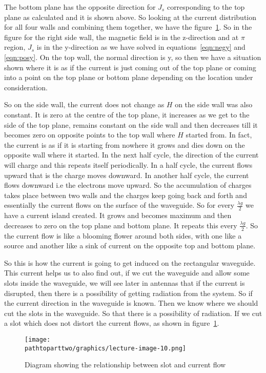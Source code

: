 The bottom plane has the opposite direction for $J_{s}$ corresponding to the top plane as calculated and it is shown above. So looking at the current distribution for all four walls and combining them together, we have the figure~\ref{fig:lectureimage10}. So in the figure for the right side wall, the magnetic field is in the z-direction and at $\pi$ region, $J_{s}$ is in the y-direction as we have solved in equations~\ref{eqn:negy} and \ref{eqn:posy}. On the top wall, the normal direction is y, so then we have a situation shown where it is as if the current is just coming out of the top plane or coming into a point on the top plane or bottom plane depending on the location under consideration. 

So on the side wall, the current does not change as $H$ on the side wall was also constant. It is zero at the centre of the top plane, it increases as we get to the side of the top plane, remains constant on the side wall and then decreases till it becomes zero on opposite points to the top wall where $H$ started from. In fact, the current is as if it is starting from nowhere it grows and dies down on the opposite wall where it started. In the next half cycle, the direction of the current will charge and this repeats itself periodically. In a half cycle, the current flows upward that is the charge moves downward. In another half cycle, the current flows downward i.e the electrons move upward. So the accumulation of charges takes place between two walls and the charges keep going back and forth and essentially the current flows on the surface of the waveguide. So for every $\frac{\lambda g}{2}$ we have a current island created. It grows and becomes maximum and then decreases to zero on the top plane and bottom plane. It repeats this every $\frac{\lambda g}{2}$. So the current flow is like a blooming flower around both sides, with one like a source and another like a sink of current on the opposite top and bottom plane.
	
So this is how the current is going to get induced on the rectangular waveguide. This current helps us to also find out, if we cut the waveguide and allow some slots inside the waveguide, we will see later in antennas that if the current is disrupted, then there is a possibility of getting radiation from the system. So if the current direction in the waveguide is known. Then we know where we should cut the slots in the waveguide. So that there is a possibility of radiation. If we cut a slot which does not distort the current flows, as shown in figure~\ref{fig:lectureimage10}.
\begin{figure}[h]
\centering
\texttt{[image: \\pathtoparttwo/graphics/lecture-image-10.png]}
\label{fig:lectureimage10}
\caption{Diagram showing the relationship between slot and current flow}
\end{figure}

